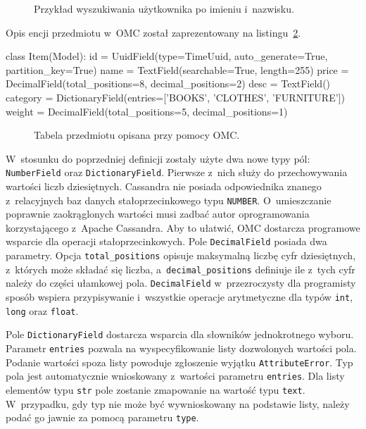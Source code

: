 \begin{figure}[ht!]
	\centering
	\theverbbox
	\caption{Przykład wyszukiwania użytkownika po imieniu i~nazwisku.}
	\label{lst:user_search_by_name_surname}
\end{figure}

Opis encji przedmiotu w~OMC został zaprezentowany na listingu~\ref{lst:omc_item_definition}. 

\begin{verbbox}
class Item(Model):
    id = UuidField(type=TimeUuid, auto_generate=True, partition_key=True)
    name = TextField(searchable=True, length=255)
    price = DecimalField(total_positions=8, decimal_positions=2)
    desc = TextField()
    category = DictionaryField(entries=['BOOKS', 'CLOTHES', 'FURNITURE'])
    weight = DecimalField(total_positions=5, decimal_positions=1)
\end{verbbox}

\begin{figure}[ht!]
	\centering
	\theverbbox
	\caption{Tabela przedmiotu opisana przy pomocy OMC.}
	\label{lst:omc_item_definition}
\end{figure}

W~stosunku do poprzedniej definicji zostały użyte dwa nowe typy pól: \verb+NumberField+ oraz \verb+DictionaryField+. Pierwsze z~nich służy do przechowywania wartości liczb dziesiętnych. Cassandra nie posiada odpowiednika znanego z~relacyjnych baz danych stałoprzecinkowego typu \verb+NUMBER+. O~umieszczanie poprawnie zaokrąglonych wartości musi zadbać autor oprogramowania korzystającego z~Apache Cassandra. Aby to ułatwić, OMC dostarcza programowe wsparcie dla operacji stałoprzecinkowych. Pole \verb+DecimalField+ posiada dwa parametry. Opcja \verb+total_positions+ opisuje maksymalną liczbę cyfr dziesiętnych, z~których może składać się liczba, a~\verb+decimal_positions+ definiuje ile z~tych cyfr należy do części ułamkowej pola. \verb+DecimalField+ w~przezroczysty dla programisty sposób wspiera przypisywanie i~wszystkie operacje arytmetyczne dla typów \verb+int+, \verb+long+ oraz \verb+float+.

Pole \verb+DictionaryField+ dostarcza wsparcia dla słowników jednokrotnego wyboru. Parametr \verb+entries+ pozwala na wyspecyfikowanie listy dozwolonych wartości pola. Podanie wartości spoza listy powoduje zgłoszenie wyjątku \verb+AttributeError+. Typ pola jest automatycznie wnioskowany z~wartości parametru \verb+entries+. Dla listy elementów typu \verb+str+ pole zostanie zmapowanie na wartość typu \verb+text+. W~przypadku, gdy typ nie może być wywnioskowany na podstawie listy, należy podać go jawnie za pomocą parametru \verb+type+.

